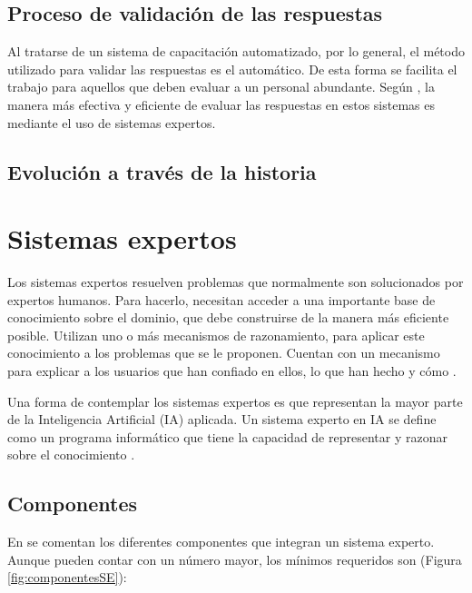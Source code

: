 \subsection{Proceso de validación de las respuestas}
Al tratarse de un sistema de capacitación automatizado, por lo general, el método utilizado para validar las respuestas es el automático. De esta forma se facilita el trabajo para aquellos que deben evaluar a un personal abundante. Según \cite{ExpertSystem}, la manera más efectiva y eficiente de evaluar las respuestas en estos sistemas es mediante el uso de sistemas expertos.

\subsection{Evolución a través de la historia}

\section{Sistemas expertos}
Los sistemas expertos resuelven problemas que normalmente son solucionados por expertos humanos. Para hacerlo, necesitan acceder a una importante base de conocimiento sobre el dominio, que debe construirse de la manera más eficiente posible. Utilizan uno o más mecanismos de razonamiento, para aplicar este conocimiento a los problemas que se le proponen. Cuentan con un mecanismo para explicar a los usuarios que han confiado en ellos, lo que han hecho y cómo \cite{VonRueden2019}.

Una forma de contemplar los sistemas expertos es que representan la mayor parte de la Inteligencia Artificial (IA) aplicada. Un sistema experto en IA se define como un programa informático que tiene la capacidad de representar y razonar sobre el conocimiento \cite{SEdiagramas}.

\subsection{Componentes}
En \cite{OdhiamboOmuya2021} se comentan los diferentes componentes que integran un sistema experto. Aunque pueden contar con un número mayor, los mínimos requeridos son (Figura \ref{fig:componentesSE}):

